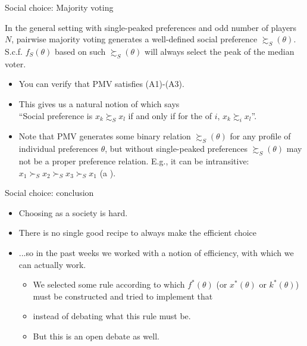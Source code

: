\documentclass[english,10pt
,aspectratio=169
]{beamer}
\begin{document}
\begin{frame}{Social choice: Majority voting}
	\begin{theorem}[MWG 21.D.1-2]
		In the general setting with single-peaked preferences and odd number of players $N$, \alert{pairwise majority voting} generates a well-defined social preference $\succsim_S(\theta)$.
		\\
		S.c.f. $f_S(\theta)$ based on such $\succsim_S(\theta)$ will always select the peak of the median voter.
	\end{theorem}
	\begin{itemize}
		\item You can verify that PMV satisfies (A1)-(A3).
		
		\item This gives us a natural notion of  which says \\
		``Social preference is $x_k \succsim_S x_l$ if and only if for the  of $i$,  $x_k \succsim_i x_l$''.
		
		\item Note that PMV generates some binary relation $\succsim_S(\theta)$ for any profile of individual preferences $\theta$, but without single-peaked preferences $\succsim_S(\theta)$ may not be a proper preference relation. E.g., it can be intransitive: $x_1 \succ_S x_2 \succ_S x_3 \succ_S x_1$ (a ).
	\end{itemize}
\end{frame}


\begin{frame}{Social choice: conclusion}
	\begin{itemize}
		\item Choosing as a society is hard.
		\item There is no single good recipe to always make the efficient choice
		\item ...so in the past weeks we worked with a notion of efficiency, with which we can actually work.
		\begin{itemize}
			\item We selected some rule according to which $f^*(\theta)$ (or $x^*(\theta)$ or $k^*(\theta)$) must be constructed and tried to implement that
			\item instead of debating what this rule must be.
			\item But this is an open debate as well.
		\end{itemize}
	\end{itemize}
\end{frame}
\end{document}
